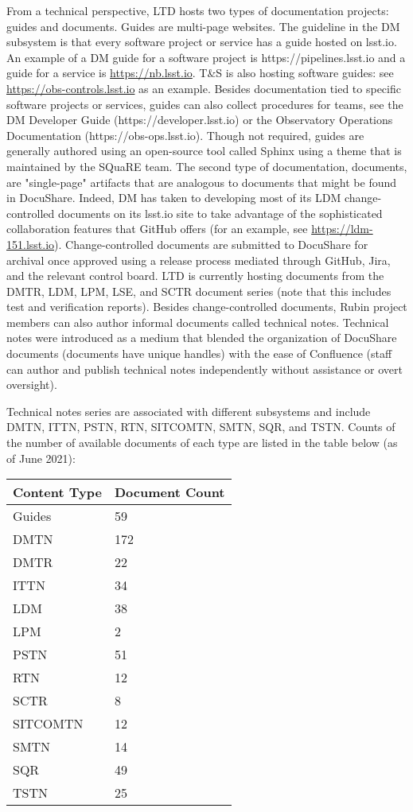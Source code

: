 From a technical perspective, LTD hosts two types of documentation projects: guides and documents. Guides are multi-page websites. The guideline in the DM subsystem is that every software project or service has a guide hosted on lsst.io. An example of a DM guide for a software project is https://pipelines.lsst.io and a guide for a service is \url{https://nb.lsst.io}. T\&S is also hosting software guides: see \url{https://obs-controls.lsst.io} as an example. Besides documentation tied to specific software projects or services, guides can also collect procedures for teams, see the DM Developer Guide (https://developer.lsst.io) or the Observatory Operations Documentation (https://obs-ops.lsst.io). Though not required, guides are generally authored using an open-source tool called Sphinx using a theme that is maintained by the SQuaRE team. The second type of documentation, documents, are "single-page" artifacts that are analogous to documents that might be found in DocuShare. Indeed, DM has taken to developing most of its LDM change-controlled documents on its lsst.io site to take advantage of the sophisticated collaboration features that GitHub offers (for an example, see \url{https://ldm-151.lsst.io}). Change-controlled documents are submitted to DocuShare for archival once approved using a release process mediated through GitHub, Jira, and the relevant control board. LTD is currently hosting documents from the DMTR, LDM, LPM, LSE, and SCTR document series (note that this includes test and verification reports). Besides change-controlled documents, Rubin project members can also author informal documents called technical notes. Technical notes were introduced as a medium that blended the organization of DocuShare documents (documents have unique handles) with the ease of Confluence (staff can author and publish technical notes independently without assistance or overt oversight). 

Technical notes series are associated with different subsystems and include DMTN, ITTN, PSTN, RTN, SITCOMTN, SMTN, SQR, and TSTN. Counts of the number of available documents of each type are listed in the table below (as of June 2021):

\begin{longtable}{p{}p{}}\hline
\textbf{Content Type} & \textbf{Document Count}  \\\hline
Guides		& 59 		\\\hline
DMTN 		& 172	\\\hline
DMTR		& 22 		\\\hline
ITTN			& 34 		\\\hline
LDM			& 38 		\\\hline
LPM 			& 2 		\\\hline
PSTN  		& 51  	\\\hline
RTN   		& 12 		\\\hline
SCTR 		& 8 		\\\hline
SITCOMTN	& 12 		\\\hline
SMTN 		& 14		\\\hline
SQR 		& 49 		\\\hline
TSTN 		& 25          \\\hline          
\end{longtable}

